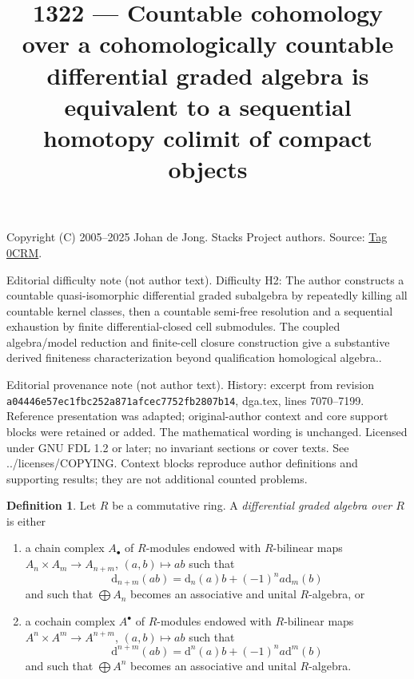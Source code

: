 \documentclass{amsart}
\theoremstyle{plain}
\theoremstyle{definition}
\newtheorem{definition}[subsection]{Definition}
\theoremstyle{remark}
\numberwithin{equation}{subsection}
\begin{document}
\title[Stacks Project, Tag 0CRM]{1322 --- Countable cohomology over a cohomologically countable differential graded algebra is equivalent to a sequential homotopy colimit of compact objects}
\maketitle
\noindent Copyright (C) 2005--2025 Johan de Jong. Stacks Project authors. Source: \href{https://stacks.math.columbia.edu/tag/0CRM}{Tag 0CRM}.

\noindent Editorial difficulty note (not author text). Difficulty H2: The author constructs a countable quasi-isomorphic differential graded subalgebra by repeatedly killing all countable kernel classes, then a countable semi-free resolution and a sequential exhaustion by finite differential-closed cell submodules. The coupled algebra/model reduction and finite-cell closure construction give a substantive derived finiteness characterization beyond qualification homological algebra..

\noindent Editorial provenance note (not author text). History: excerpt from revision \texttt{a0444\allowbreak 6e57e\allowbreak c1fbc\allowbreak 252a8\allowbreak 71afc\allowbreak ec775\allowbreak 2fb28\allowbreak 07b14}, dga.tex, lines 7070--7199. Reference presentation was adapted; original-author context and core support blocks were retained or added. The mathematical wording is unchanged. Licensed under GNU FDL 1.2 or later; no invariant sections or cover texts. See ../licenses/COPYING. Context blocks reproduce author definitions and supporting results; they are not additional counted problems.

\begin{definition}
\label{definition-dga}
Let $R$ be a commutative ring. A {\it differential graded algebra over $R$}
is either
\begin{enumerate}
\item a chain complex $A_\bullet$ of $R$-modules endowed with
$R$-bilinear maps $A_n \times A_m \to A_{n + m}$,
$(a, b) \mapsto ab$ such that
$$
\text{d}_{n + m}(ab) = \text{d}_n(a)b + (-1)^n a\text{d}_m(b)
$$
and such that $\bigoplus A_n$ becomes an associative and unital
$R$-algebra, or
\item a cochain complex $A^\bullet$ of $R$-modules endowed with
$R$-bilinear maps $A^n \times A^m \to A^{n + m}$, $(a, b) \mapsto ab$
such that
$$
\text{d}^{n + m}(ab) = \text{d}^n(a)b + (-1)^n a\text{d}^m(b)
$$
and such that $\bigoplus A^n$ becomes an associative and unital $R$-algebra.
\end{enumerate}
\end{definition}
\end{document}
